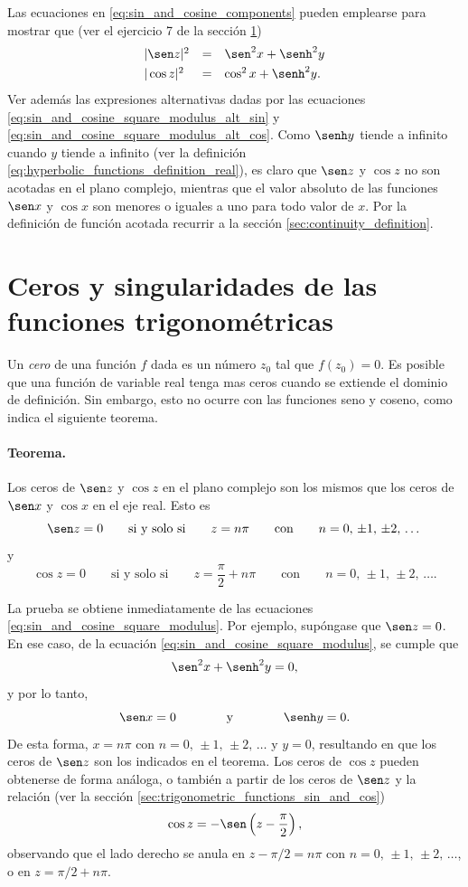 \documentclass[a4paper]{report}
\begin{document}
Las ecuaciones en \ref{eq:sin_and_cosine_components} pueden emplearse para mostrar que (ver el ejercicio 7 de la sección \ref{sec:zeros_singularities_trigonometric})
\begin{equation}\label{eq:sin_and_cosine_square_modulus}
 \begin{array}{lll}
  |\sen z|^2&=&\sen^2x+\senh^2y\\[\smallskipamount]
  |\cos z|^2&=&\cos^2x+\senh^2y.
 \end{array} 
\end{equation}
Ver además las expresiones alternativas dadas por las ecuaciones \ref{eq:sin_and_cosine_square_modulus_alt_sin} y \ref{eq:sin_and_cosine_square_modulus_alt_cos}.
Como \(\senh y\) tiende a infinito cuando \(y\) tiende a infinito (ver la definición \ref{eq:hyperbolic_functions_definition_real}), es claro que \(\sen z\) y \(\cos z\) no son acotadas en el plano complejo, mientras que el valor absoluto de las funciones \(\sen x\) y \(\cos x\) son menores o iguales a uno para todo valor de \(x\). Por la definición de función acotada recurrir a la sección \ref{sec:continuity_definition}.

\section{Ceros y singularidades de las funciones trigonométricas}\label{sec:zeros_singularities_trigonometric}

Un \emph{cero} de una función \(f\) dada es un número \(z_0\) tal que \(f(z_0)=0\). Es posible que una función de variable real tenga mas ceros cuando se extiende el dominio de definición. Sin embargo, esto no ocurre con las funciones seno y coseno, como indica el siguiente teorema.

\paragraph{Teorema.} Los ceros de \(\sen z\) y \(\cos z\) en el plano complejo son los mismos que los ceros de \(\sen x\) y \(\cos x\) en el eje real. Esto es
\[
 \sen z=0
 \qquad\textrm{si y solo si}\qquad
 z=n\pi
 \qquad\textrm{con}\qquad 
 n=0,\,\pm1,\,\pm2,\,\dots
\]
y
\[
 \cos z=0
 \qquad\textrm{si y solo si}\qquad
 z=\frac{\pi}{2}+n\pi
 \qquad\textrm{con}\qquad 
 n=0,\,\pm1,\,\pm2,\,\dots.
\]

La prueba se obtiene inmediatamente de las ecuaciones \ref{eq:sin_and_cosine_square_modulus}. Por ejemplo, supóngase que \(\sen z=0\). En ese caso, de la ecuación \ref{eq:sin_and_cosine_square_modulus}, se cumple que 
\[
 \sen^2x+\senh^2y=0,
\]
y por lo tanto,
\[
 \sen x=0
 \qquad\qquad\textrm{y}\qquad\qquad
 \senh y=0.
\]
De esta forma, \(x=n\pi\) con \(n=0,\,\pm1,\,\pm2,\,\dots\) y \(y=0\), resultando en que los ceros de \(\sen z\) son los indicados en el teorema. Los ceros de \(\cos z\) pueden obtenerse de forma análoga, o también a partir de los ceros de \(\sen z\) y la relación (ver la sección \ref{sec:trigonometric_functions_sin_and_cos})
\[
 \cos z=-\sen\left(z-\frac{\pi}{2}\right),
\]
observando que el lado derecho se anula en \(z-\pi/2=n\pi\) con \(n=0,\,\pm1,\,\pm2,\,\dots\), o en \(z=\pi/2+n\pi\).
\end{document}
